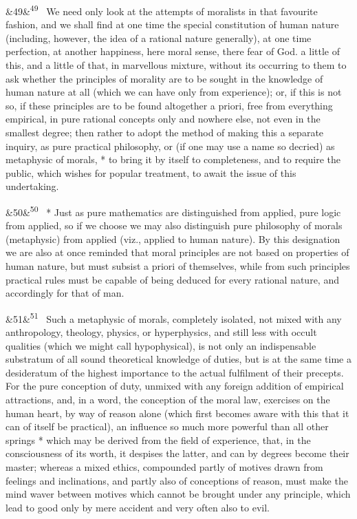 \documentclass[12pt]{article}
\newcommand{\para}[1][]{\par\noindent\ifx&#1&\else\textsuperscript{\footnotesize #1}~\fi}
\begin{document}
\para[49] We need only look at the attempts of moralists in that favourite fashion, and we shall find at one time the special constitution of human nature (including, however, the idea of a rational nature generally), at one time perfection, at another happiness, here moral sense, there fear of God. a little of this, and a little of that, in marvellous mixture, without its occurring to them to ask whether the principles of morality are to be sought in the knowledge of human nature at all (which we can have only from experience); or, if this is not so, if these principles are to be found altogether a priori, free from everything empirical, in pure rational concepts only and nowhere else, not even in the smallest degree; then rather to adopt the method of making this a separate inquiry, as pure practical philosophy, or (if one may use a name so decried) as metaphysic of morals, * to bring it by itself to completeness, and to require the public, which wishes for popular treatment, to await the issue of this undertaking.

\para[50] * Just as pure mathematics are distinguished from applied, pure logic from applied, so if we choose we may also distinguish pure philosophy of morals (metaphysic) from applied (viz., applied to human nature). By this designation we are also at once reminded that moral principles are not based on properties of human nature, but must subsist a priori of themselves, while from such principles practical rules must be capable of being deduced for every rational nature, and accordingly for that of man.

\para[51] Such a metaphysic of morals, completely isolated, not mixed with any anthropology, theology, physics, or hyperphysics, and still less with occult qualities (which we might call hypophysical), is not only an indispensable substratum of all sound theoretical knowledge of duties, but is at the same time a desideratum of the highest importance to the actual fulfilment of their precepts. For the pure conception of duty, unmixed with any foreign addition of empirical attractions, and, in a word, the conception of the moral law, exercises on the human heart, by way of reason alone (which first becomes aware with this that it can of itself be practical), an influence so much more powerful than all other springs * which may be derived from the field of experience, that, in the consciousness of its worth, it despises the latter, and can by degrees become their master; whereas a mixed ethics, compounded partly of motives drawn from feelings and inclinations, and partly also of conceptions of reason, must make the mind waver between motives which cannot be brought under any principle, which lead to good only by mere accident and very often also to evil.
\end{document}

